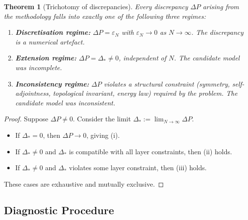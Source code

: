 \documentclass[11pt,a4paper]{article}
\theoremstyle{definition}
\theoremstyle{plain}
\newtheorem{theorem}[definition]{Theorem}
\begin{document}
\begin{theorem}[Trichotomy of discrepancies]\label{thm:trichotomy}
Every discrepancy $\Delta P$ arising from the methodology falls into
exactly one of the following three regimes:
\begin{enumerate}[label=\textbf{(\roman*)}]
  \item \textbf{Discretisation regime:}
        $\Delta P = \varepsilon_N$ with $\varepsilon_N \to 0$ as
        $N \to \infty$. The discrepancy is a numerical artefact.
  \item \textbf{Extension regime:}
        $\Delta P = \Delta_\ast \neq 0$, independent of $N$. The
        candidate model was incomplete.
  \item \textbf{Inconsistency regime:}
        $\Delta P$ violates a structural constraint (symmetry,
        self-adjointness, topological invariant, energy law) required
        by the problem. The candidate model was inconsistent.
\end{enumerate}
\end{theorem}

\begin{proof}
Suppose $\Delta P \neq 0$. Consider the limit
$\Delta_\ast := \lim_{N \to \infty} \Delta P$.
\begin{itemize}
  \item If $\Delta_\ast = 0$, then $\Delta P \to 0$, giving (i).
  \item If $\Delta_\ast \neq 0$ and $\Delta_\ast$ is compatible with
        all layer constraints, then (ii) holds.
  \item If $\Delta_\ast \neq 0$ and $\Delta_\ast$ violates some
        layer constraint, then (iii) holds.
\end{itemize}
These cases are exhaustive and mutually exclusive.
\end{proof}

\subsection{Diagnostic Procedure}
\end{document}

